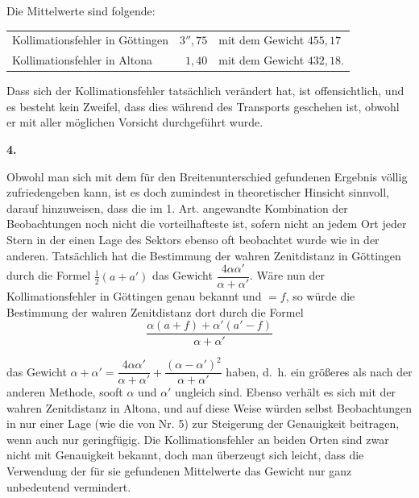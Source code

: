 Die Mittelwerte sind folgende:
\begin{center}
\begin{tabular}{@{}l@{\qquad}r@{\enspace}l@{}}
Kollimationsfehler in Göttingen & \(3''{,}75\) & mit dem Gewicht \(455{,}17\)\\
Kollimationsfehler in Altona & \(1{,}40\) & mit dem Gewicht \(432{,}18\).
\end{tabular}
\end{center}

Dass sich der Kollimationsfehler tatsächlich verändert hat, ist offensichtlich,
und es besteht kein Zweifel, dass dies während des Transports geschehen ist,
obwohl er mit aller möglichen Vorsicht durchgeführt wurde.

\begin{center}\textbf{4.}\end{center}

Obwohl man sich mit dem für den Breitenunterschied gefundenen
Ergebnis völlig zufriedengeben kann, ist es doch zumindest in theoretischer
Hinsicht sinnvoll, darauf hinzuweisen, dass die im 1. Art. angewandte
Kombination der Beobachtungen noch nicht die vorteilhafteste ist,
sofern nicht an jedem Ort jeder Stern in der einen Lage des Sektors ebenso
oft beobachtet wurde wie in der anderen. Tatsächlich hat die Bestimmung der
wahren Zenitdistanz in Göttingen durch die Formel \(\tfrac12(a+a')\) das Gewicht
\(\dfrac{4\alpha\alpha'}{\alpha+\alpha'}\). Wäre nun der Kollimationsfehler in Göttingen genau
bekannt und \(=f\),
so würde die Bestimmung der wahren Zenitdistanz dort durch die Formel
\[
\frac{\alpha(a+f)+\alpha'(a'-f)}{\alpha+\alpha'}
\]

\par\clearpage
\noindent\makebox[12mm][l]{}\par\medskip

\noindent das Gewicht \(\alpha+\alpha'=\dfrac{4\alpha\alpha'}{\alpha+\alpha'}+
\dfrac{(\alpha-\alpha')^2}{\alpha+\alpha'}\) haben, d.\ h. ein größeres als nach der
anderen Methode, sooft \(\alpha\) und \(\alpha'\) ungleich sind. Ebenso verhält es sich mit
der wahren Zenitdistanz in Altona, und auf diese Weise würden selbst
Beobachtungen in nur einer Lage (wie die von Nr. 5) zur Steigerung der
Genauigkeit beitragen, wenn auch nur geringfügig. Die Kollimationsfehler
an beiden Orten sind zwar nicht mit  Genauigkeit bekannt,
doch man überzeugt sich leicht, dass die Verwendung der für sie gefundenen
Mittelwerte das Gewicht nur ganz unbedeutend vermindert.

